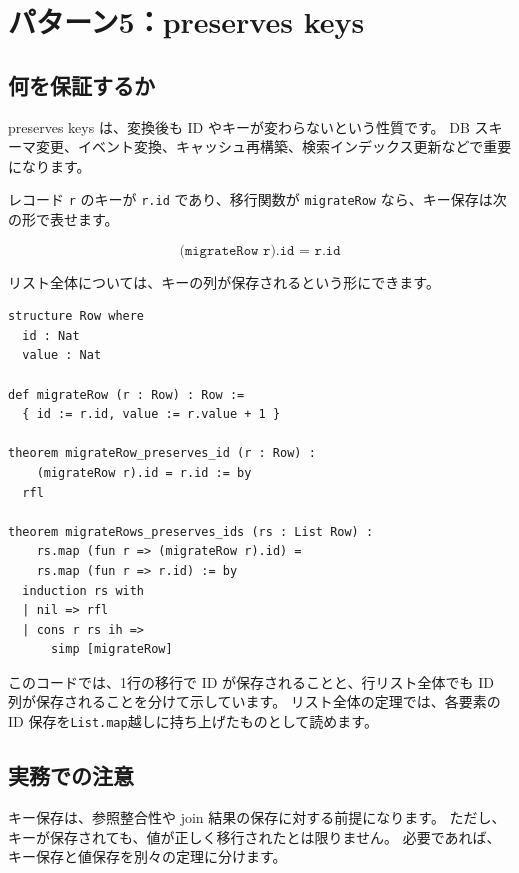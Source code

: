 \section{パターン5：preserves keys}

\subsection{何を保証するか}

preserves keys は、変換後も ID やキーが変わらないという性質です。
DB スキーマ変更、イベント変換、キャッシュ再構築、検索インデックス更新などで重要になります。

レコード \texttt{r} のキーが \texttt{r.id} であり、移行関数が \texttt{migrateRow} なら、キー保存は次の形で表せます。

\[
\texttt{(migrateRow r).id = r.id}
\]

リスト全体については、キーの列が保存されるという形にできます。

\begin{listing}[htbp]
\begin{verbatim}
structure Row where
  id : Nat
  value : Nat

def migrateRow (r : Row) : Row :=
  { id := r.id, value := r.value + 1 }

theorem migrateRow_preserves_id (r : Row) :
    (migrateRow r).id = r.id := by
  rfl

theorem migrateRows_preserves_ids (rs : List Row) :
    rs.map (fun r => (migrateRow r).id) =
    rs.map (fun r => r.id) := by
  induction rs with
  | nil => rfl
  | cons r rs ih =>
      simp [migrateRow]
\end{verbatim}
\caption{\texttt{migrateRow\_preserves\_id}・\texttt{migrateRows\_preserves\_ids}}
\label{lst:appc_preserves_keys}
\end{listing}

このコードでは、1行の移行で ID が保存されることと、行リスト全体でも ID 列が保存されることを分けて示しています。
リスト全体の定理では、各要素の ID 保存を\texttt{List.map}越しに持ち上げたものとして読めます。

\subsection{実務での注意}

キー保存は、参照整合性や join 結果の保存に対する前提になります。
ただし、キーが保存されても、値が正しく移行されたとは限りません。
必要であれば、キー保存と値保存を別々の定理に分けます。


